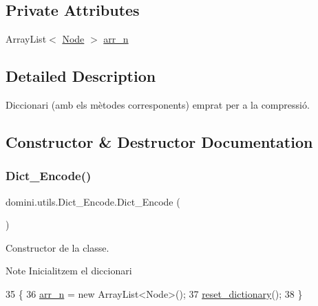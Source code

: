\subsection*{Private Attributes}
\begin{DoxyCompactItemize}
\item 
Array\+List$<$ \hyperlink{classdomini_1_1utils_1_1Node}{Node} $>$ \hyperlink{classdomini_1_1utils_1_1Dict__Encode_abc506ae01222e16d9b6581efbdad1a97}{arr\+\_\+n}
\end{DoxyCompactItemize}


\subsection{Detailed Description}
Diccionari (amb els mètodes corresponents) emprat per a la compressió. 

\subsection{Constructor \& Destructor Documentation}
\mbox{\label{classdomini_1_1utils_1_1Dict__Encode_aa16372a031311494fdcae13d1a9b48c3}} 
\subsubsection{\texorpdfstring{Dict\+\_\+\+Encode()}{Dict\_Encode()}}
{\footnotesize\ttfamily domini.\+utils.\+Dict\+\_\+\+Encode.\+Dict\+\_\+\+Encode (\begin{DoxyParamCaption}{ }\end{DoxyParamCaption})\hspace{0.3cm}{\ttfamily [inline]}}



Constructor de la classe. 

\begin{DoxyNote}{Note}
Inicialitzem el diccionari 
\end{DoxyNote}

\begin{DoxyCode}
35                          \{
36         \hyperlink{classdomini_1_1utils_1_1Dict__Encode_abc506ae01222e16d9b6581efbdad1a97}{arr\_n} = \textcolor{keyword}{new} ArrayList<Node>();
37         \hyperlink{classdomini_1_1utils_1_1Dict__Encode_a6c3016286b3bb242d12799f8e7ebb585}{reset\_dictionary}();
38     \}
\end{DoxyCode}



